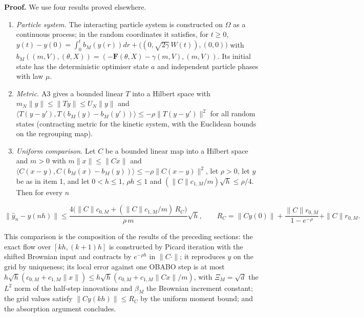 \documentclass[11pt,a4paper]{report}
\begin{document}
\textbf{Proof.} We use four results proved elsewhere.



\begin{enumerate}


\item \emph{Particle system.} The interacting particle system is constructed on \(\Omega\) as a continuous process; in the random coordinates it satisfies, for \(t\ge0\), \(y(t)-y(0)=\int_0^tb_M(y(r))dr+\bigl((0,\sqrt{2\gamma}\,W(t)),(0,0)\bigr)\) with \(b_M((m,V),(\theta,X))=(-\mathbf F(\theta,X)-\gamma(m,V),(m,V))\). Its initial state has the deterministic optimiser state \(a\) and independent particle phases with law \(\mu\).

\item \emph{Metric.} A3 gives a bounded linear \(T\) into a Hilbert space with \(m_N\|y\|\le\|Ty\|\le U_N\|y\|\) and \(\langle T(y-y'),T(b_M(y)-b_M(y'))\rangle\le-\rho\|T(y-y')\|^2\) for all random states (contracting metric for the kinetic system, with the Euclidean bounds on the regrouping map).

\item \emph{Uniform comparison.} Let \(C\) be a bounded linear map into a Hilbert space and \(m>0\) with \(m\|x\|\le\|Cx\|\) and \(\langle C(x-y),C(b_M(x)-b_M(y))\rangle\le-\rho\|C(x-y)\|^2\), let \(\rho>0\), let \(y\) be as in item 1, and let \(0<h\le1\), \(\rho h\le1\) and \((\|C\|c_{1,M}/m)\sqrt h\le\rho/4\). Then for every \(n\)

\end{enumerate}

\[\|\hat y_n-y(nh)\|\le\frac{4\bigl(\|C\|c_{0,M}+(\|C\|c_{1,M}/m)\,R_C\bigr)}{\rho\,m}\sqrt h,\qquad R_C=\|Cy(0)\|+\frac{\|C\|r_{0,M}}{1-e^{-\rho}}+\|C\|r_{0,M}.\]


This comparison is the composition of the results of the preceding sections: the exact flow over \([kh,(k+1)h]\) is constructed by Picard iteration with the shifted Brownian input and contracts by \(e^{-\rho h}\) in \(\|C\cdot\|\); it reproduces \(y\) on the grid by uniqueness; its local error against one OBABO step is at most \(h\sqrt h(c_{0,M}+c_{1,M}\|x\|)\le h\sqrt h(c_{0,M}+c_{1,M}\|Cx\|/m)\), with \(\Xi_M=\sqrt d\) the \(L^2\) norm of the half-step innovations and \(\beta_M\) the Brownian increment constant; the grid values satisfy \(\|Cy(kh)\|\le R_C\) by the uniform moment bound; and the absorption argument concludes.
\end{document}
